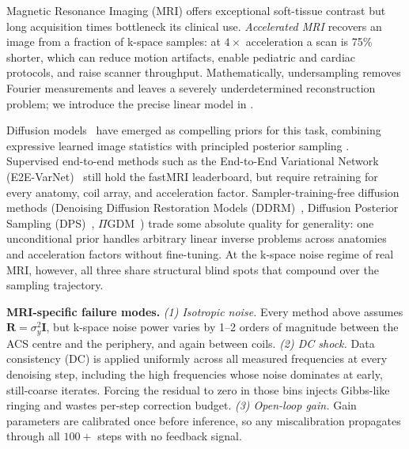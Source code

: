 \documentclass[10pt,twocolumn,letterpaper]{article}
\begin{document}
Magnetic Resonance Imaging (MRI) offers exceptional soft-tissue contrast but
long acquisition times bottleneck its clinical use. \emph{Accelerated MRI}
recovers an image from a fraction of k-space samples: at $4\times$
acceleration a scan is 75\% shorter, which can reduce motion artifacts, enable
pediatric and cardiac protocols, and raise scanner throughput. Mathematically,
undersampling removes Fourier measurements and leaves a severely underdetermined
reconstruction problem; we introduce the precise linear model in
.

Diffusion models~\cite{ho2020ddpm,song2021score,karras2022edm} have emerged
as compelling priors for this task, combining expressive learned image
statistics with principled posterior sampling
\cite{jalal2021robust,chung2022scoremri}. Supervised end-to-end methods such
as the End-to-End Variational Network
(E2E-VarNet)~\cite{sriram2020varnet} still hold the fastMRI leaderboard,
but require retraining for every anatomy, coil array, and acceleration
factor. Sampler-training-free diffusion methods
(Denoising Diffusion Restoration Models (DDRM)~\cite{kawar2022ddrm},
Diffusion Posterior Sampling (DPS)~\cite{chung2023dps},
$\Pi$GDM~\cite{song2023pigdm}) trade some absolute quality for generality:
one unconditional prior handles arbitrary linear inverse problems across
anatomies and acceleration factors without fine-tuning. At the k-space noise
regime of real MRI, however, all three share structural blind spots that
compound over the sampling trajectory.

\textbf{MRI-specific failure modes.}
\textit{(1) Isotropic noise.} Every method above assumes
$\mathbf{R}=\sigma_y^2\mathbf{I}$, but k-space noise power varies by
1--2 orders of magnitude between the ACS centre and the periphery, and again
between coils.
\textit{(2) DC shock.} Data consistency (DC) is applied uniformly across all
measured frequencies at every denoising step, including the high
frequencies whose noise dominates at early, still-coarse iterates. Forcing
the residual to zero in those bins injects Gibbs-like ringing and wastes
per-step correction budget.
\textit{(3) Open-loop gain.} Gain parameters are calibrated once before
inference, so any miscalibration propagates through all $100+$ steps with no
feedback signal.
\end{document}
